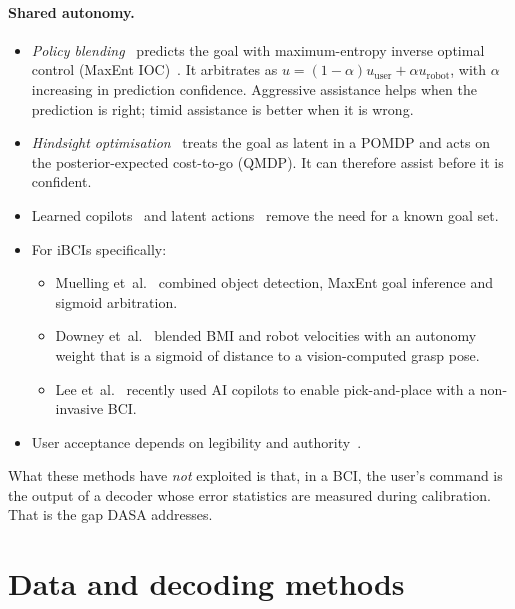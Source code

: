 \paragraph{Shared autonomy.}
\begin{itemize}
\item \emph{Policy blending}~\cite{dragan2013policy} predicts the goal with maximum-entropy
  inverse optimal control (MaxEnt IOC)~\cite{ziebart2008maximum}. It arbitrates as
  $u=(1-\alpha)u_{\text{user}}+\alpha u_{\text{robot}}$, with $\alpha$ increasing in
  prediction confidence. Aggressive assistance helps when the prediction is right;
  timid assistance is better when it is wrong.
\item \emph{Hindsight optimisation}~\cite{javdani2015shared,javdani2018shared} treats
  the goal as latent in a POMDP and acts on the posterior-expected cost-to-go (QMDP).
  It can therefore assist before it is confident.
\item Learned copilots~\cite{reddy2018shared,lee2025copilots} and latent
  actions~\cite{losey2020controlling,jeon2020shared,losey2022learning} remove the need
  for a known goal set.
\item For iBCIs specifically:
  \begin{itemize}
  \item Muelling et~al.~\cite{muelling2017autonomy} combined object detection, MaxEnt
    goal inference and sigmoid arbitration.
  \item Downey et~al.~\cite{downey2016blending} blended BMI and robot velocities with an
    autonomy weight that is a sigmoid of distance to a vision-computed grasp pose.
  \item Lee et~al.~\cite{lee2025copilots} recently used AI copilots to enable
    pick-and-place with a non-invasive BCI.
  \end{itemize}
\item User acceptance depends on legibility and authority~\cite{brooks2020visualization,gopinath2017human}.
\end{itemize}
What these methods have \emph{not} exploited is that, in a BCI, the user's command is
the output of a decoder whose error statistics are measured during calibration. That
is the gap DASA addresses.

\section{Data and decoding methods}

